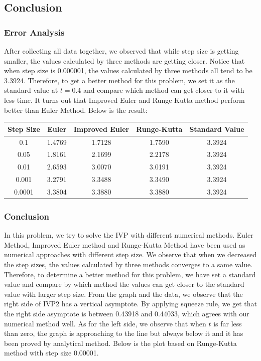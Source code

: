 \documentclass[11pt,a4paper]{article}
\begin{document}
\subsection{Conclusion}

\subsubsection{Error Analysis}

After collecting all data together, we observed that while step size is getting smaller, the values calculated by three methods are getting closer. Notice that when step size is 0.000001, the values calculated by three methods all tend to be 3.3924. Therefore, to get a better method for this problem, we set it as the standard value at $t = 0.4$ and compare which method can get closer to it with less time. It turns out that Improved Euler and Runge Kutta method perform better than Euler Method. Below is the result:

\begin{table}[H]
	\centering
	\begin{tabular}{c|c|c|c|c}
		Step Size & Euler  & Improved Euler & Runge-Kutta & Standard Value \\ \hline
		0.1       & 1.4769 & 1.7128         & 1.7590      & 3.3924         \\ \hline
		0.05      & 1.8161 & 2.1699         & 2.2178      & 3.3924         \\ \hline
		0.01      & 2.6593 & 3.0070         & 3.0191      & 3.3924         \\ \hline
		0.001     & 3.2791 & 3.3488         & 3.3490      & 3.3924         \\ \hline
		0.0001    & 3.3804 & 3.3880         & 3.3880      & 3.3924        
	\end{tabular}
\end{table}

\subsubsection{Conclusion}

In this problem, we try to solve the IVP with different numerical methods. Euler Method, Improved Euler method and Runge-Kutta Method have been used as numerical approaches with different step size. We observe that when we decreased the step sizes, the values calculated by three methods converges to a same value. Therefore, to determine a better method for this problem, we have set a standard value and compare by which method the values can get closer to the standard value with larger step size. 
From the graph and the data, we observe that the right side of IVP2 has a vertical asymptote. By applying squeeze rule, we get that the right side asymptote is between 0.43918 and 0.44033, which agrees with our numerical method well. As for the left side, we observe that when $t$ is far less than zero, the graph is approaching to the line but always below it and it has been proved by analytical method. 
Below is the plot based on Runge-Kutta method with step size 0.00001. 
\end{document}
